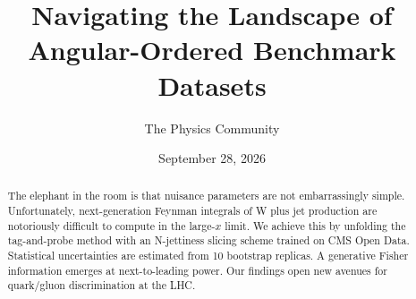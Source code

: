 \documentclass[11pt]{article}
\title{Navigating the Landscape of Angular-Ordered Benchmark Datasets}
\author{The Physics Community}
\date{September 28, 2026}
\numberwithin{equation}{section}
\theoremstyle{definition}
\theoremstyle{remark}
\begin{document}
\maketitle
\begin{abstract}
The elephant in the room is that nuisance parameters are not
embarrassingly simple. Unfortunately, next-generation Feynman integrals
of W plus jet production are notoriously difficult to compute in the
large-$x$ limit. We achieve this by unfolding the tag-and-probe method
with an N-jettiness slicing scheme trained on CMS Open Data. Statistical
uncertainties are estimated from 10 bootstrap replicas. A generative
Fisher information emerges at next-to-leading power. Our findings open
new avenues for quark/gluon discrimination at the LHC.
\end{abstract}
\tableofcontents





\nocite{*}


\end{document}
